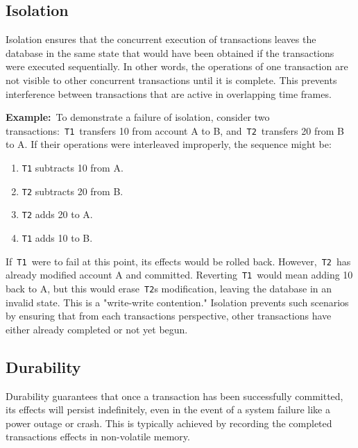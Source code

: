 \documentclass{scrbook}
\begin{document}
\subsection{Isolation}

Isolation ensures that the concurrent execution of transactions leaves
the database in the same state that would have been obtained if the
transactions were executed sequentially. In other words, the operations
of one transaction are not visible to other concurrent transactions
until it is complete. This prevents interference between transactions
that are active in overlapping time frames.

\textbf{Example:}~To demonstrate a failure of isolation, consider two
transactions:~\texttt{T1}~transfers 10 from account A to B,
and~\texttt{T2}~transfers 20 from B to A. If their operations were
interleaved improperly, the sequence might be:

\begin{enumerate}
    \item
    \texttt{T1} subtracts 10 from A.

    \item
    \texttt{T2} subtracts 20 from B.

    \item
    \texttt{T2} adds 20 to A.

    \item
    \texttt{T1} adds 10 to B.
\end{enumerate}

If~\texttt{T1}~were to fail at this point, its effects would be rolled
back. However,~\texttt{T2}~has already modified account A and committed.
Reverting~\texttt{T1}~would mean adding 10 back to A, but this would
erase~\texttt{T2}\textquotesingle s modification, leaving the database
in an invalid state. This is a "write-write contention." Isolation
prevents such scenarios by ensuring that from each
transaction\textquotesingle s perspective, other transactions have
either already completed or not yet begun.

\subsection{Durability}

Durability guarantees that once a transaction has been successfully
committed, its effects will persist indefinitely, even in the event of a
system failure like a power outage or crash. This is typically achieved
by recording the completed transaction\textquotesingle s effects in
non-volatile memory.
\end{document}
